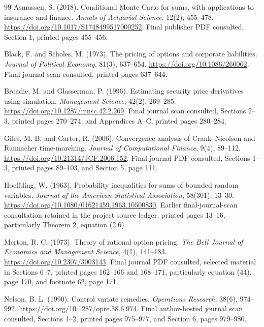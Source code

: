 \documentclass[11pt]{article}
\begin{document}
\begin{thebibliography}{99}
Asmussen, S. (2018). Conditional Monte Carlo for sums, with applications to insurance and finance. \emph{Annals of Actuarial Science}, 12(2), 455--478. \url{https://doi.org/10.1017/S1748499517000252}. Final publisher PDF consulted, Section 1, printed pages 455--456.

Black, F. and Scholes, M. (1973). The pricing of options and corporate liabilities. \emph{Journal of Political Economy}, 81(3), 637--654. \url{https://doi.org/10.1086/260062}. Final journal scan consulted, printed pages 637--644.

Broadie, M. and Glasserman, P. (1996). Estimating security price derivatives using simulation. \emph{Management Science}, 42(2), 269--285. \url{https://doi.org/10.1287/mnsc.42.2.269}. Final journal scan consulted, Sections 2--3, printed pages 270--274, and Appendices A--C, printed pages 280--284.

Giles, M. B. and Carter, R. (2006). Convergence analysis of Crank--Nicolson and Rannacher time-marching. \emph{Journal of Computational Finance}, 9(4), 89--112. \url{https://doi.org/10.21314/JCF.2006.152}. Final journal PDF consulted, Sections 1--3, printed pages 89--103, and Section 5, page 111.

 Hoeffding, W. (1963). Probability inequalities for sums of bounded random variables. \emph{Journal of the American Statistical Association}, 58(301), 13--30. \url{https://doi.org/10.1080/01621459.1963.10500830}. Earlier final-journal-scan consultation retained in the project source ledger, printed pages 13--16, particularly Theorem 2, equation (2.6).

Merton, R. C. (1973). Theory of rational option pricing. \emph{The Bell Journal of Economics and Management Science}, 4(1), 141--183. \url{https://doi.org/10.2307/3003143}. Final journal PDF consulted, selected material in Sections 6--7, printed pages 162--166 and 168--171, particularly equation (44), page 170, and footnote 62, page 171.

Nelson, B. L. (1990). Control variate remedies. \emph{Operations Research}, 38(6), 974--992. \url{https://doi.org/10.1287/opre.38.6.974}. Final author-hosted journal scan consulted, Sections 1--2, printed pages 975--977, and Section 6, pages 979--980.
\end{thebibliography}
\end{document}
